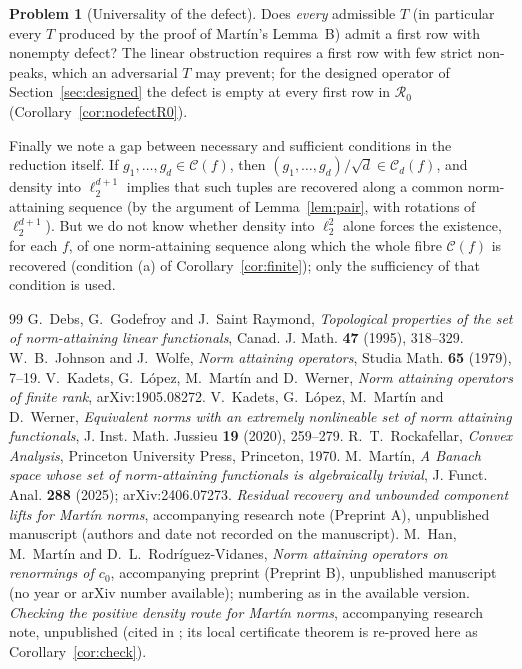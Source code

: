 \documentclass[10pt]{amsart}
\theoremstyle{definition}
\newtheorem{problem}[theorem]{Problem}
\theoremstyle{remark}
\newcommand{\Cset}{\mathcal C}
\begin{document}
\begin{problem}[Universality of the defect]\label{prob:universal}
Does \emph{every} admissible $T$ (in particular every $T$ produced by the
proof of Mart\'in's Lemma~B) admit a first row with nonempty defect?  The
linear obstruction requires a first row with few strict non-peaks, which an
adversarial $T$ may prevent; for the designed operator of
Section~\ref{sec:designed} the defect is empty at every first row in
$\mathcal R_0$ (Corollary~\ref{cor:nodefectR0}).
\end{problem}

Finally we note a gap between necessary and sufficient conditions in the
reduction itself.  If $g_1,\dots,g_d\in\Cset(f)$, then
$(g_1,\dots,g_d)/\sqrt d\in\Cset_d(f)$, and density into $\ell_2^{d+1}$
implies that such tuples are recovered along a common norm-attaining
sequence (by the argument of Lemma~\ref{lem:pair}, with rotations of
$\ell_2^{d+1}$).  But we do not
know whether density into $\ell_2^2$ alone forces the existence, for each
$f$, of one norm-attaining sequence along which the whole fibre $\Cset(f)$ is
recovered (condition (a) of Corollary~\ref{cor:finite}); only the
sufficiency of that condition is used.

\begin{thebibliography}{99}
G.~Debs, G.~Godefroy and J.~Saint Raymond,
\emph{Topological properties of the set of norm-attaining linear
functionals}, Canad. J. Math. \textbf{47} (1995), 318--329.
W.~B.~Johnson and J.~Wolfe, \emph{Norm attaining operators},
Studia Math. \textbf{65} (1979), 7--19.
V.~Kadets, G.~L\'opez, M.~Mart\'in and D.~Werner,
\emph{Norm attaining operators of finite rank}, arXiv:1905.08272.
V.~Kadets, G.~L\'opez, M.~Mart\'in and D.~Werner,
\emph{Equivalent norms with an extremely nonlineable set of norm attaining
functionals}, J. Inst. Math. Jussieu \textbf{19} (2020), 259--279.
R.~T.~Rockafellar, \emph{Convex Analysis}, Princeton University Press,
Princeton, 1970.
M.~Mart\'in,
\emph{A Banach space whose set of norm-attaining functionals is
algebraically trivial}, J. Funct. Anal. \textbf{288} (2025);
arXiv:2406.07273.
\emph{Residual recovery and unbounded component lifts for Mart\'in norms},
accompanying research note (Preprint A), unpublished manuscript (authors
and date not recorded on the manuscript).
M.~Han, M.~Mart\'in and D.~L.~Rodr\'iguez-Vidanes,
\emph{Norm attaining operators on renormings of $c_0$}, accompanying
preprint (Preprint B), unpublished manuscript (no year or arXiv number
available); numbering as in the available version.
\emph{Checking the positive density route for Mart\'in norms},
accompanying research note, unpublished (cited in \cite{PrA}; its local
certificate theorem is re-proved here as Corollary~\ref{cor:check}).
\end{thebibliography}
\end{document}
